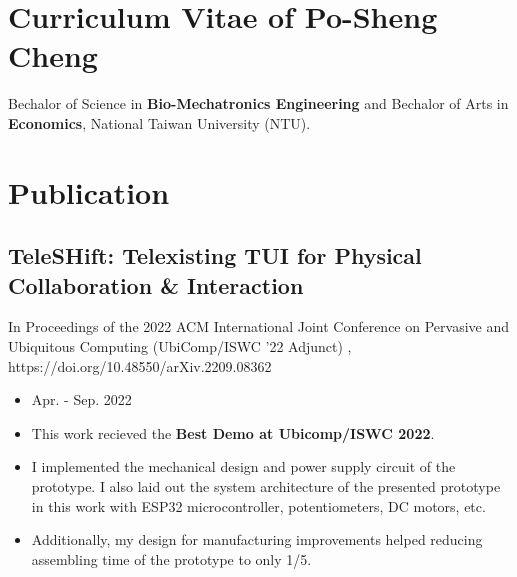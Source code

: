 \documentclass[12pt]{article}
\begin{document}
    \section*{Curriculum Vitae of Po-Sheng Cheng} 
    {\sffamily
    Bechalor of Science in \textbf{Bio-Mechatronics Engineering} and Bechalor of Arts in \textbf{Economics}, National Taiwan University (NTU).
    }
    \section*{Publication}
        \subsection*{TeleSHift: Telexisting TUI for Physical Collaboration \& Interaction}
        {\sffamily
        {\footnotesize In Proceedings of the 2022 ACM International Joint Conference on Pervasive and Ubiquitous Computing (UbiComp/ISWC '22 Adjunct)%
        , https://doi.org/10.48550/arXiv.2209.08362}
        \begin{itemize}
            \item Apr. - Sep. 2022
            \item This work recieved the \textbf{Best Demo at Ubicomp/ISWC 2022}.
            \item I implemented the mechanical design and power supply circuit of the prototype. I also laid out the system architecture of the presented prototype in this work with ESP32 microcontroller, potentiometers, DC motors, etc. 
            \item Additionally, my design for manufacturing improvements helped reducing assembling time of the prototype to only 1/5.
        \end{itemize}
        }
\end{document}
